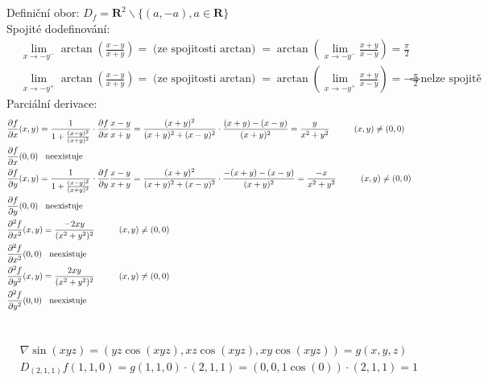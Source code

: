 \documentclass[a4paper]{article}
\begin{document}
\section{}
Definiční obor: $D_f = \mathbf{R}^2 \backslash \{ (a,-a), a \in \mathbf{R} \}$ \\
Spojité dodefinování:
\begin{align*}
	& \lim_{x \to -y^-} \arctan(\frac{x-y}{x+y}) = \text{(ze spojitosti $\arctan$)} = \arctan(\lim_{x \to -y^-} \frac{x+y}{x-y}) = \frac{\pi}{2}  \\
	& \lim_{x \to -y^+} \arctan(\frac{x-y}{x+y}) = \text{(ze spojitosti $\arctan$)} = \arctan(\lim_{x \to -y^+} \frac{x+y}{x-y}) = -\frac{\pi}{2} 
	& \Rightarrow \text{nelze spojitě dodefinovat}
\end{align*}
Parciální derivace:
\begin{align*}
	& \frac{\partial f}{\partial x} (x,y) = \frac{1}{1+\frac{(x-y)^2}{(x+y)^2}} \cdot \frac{\partial f}{\partial x}\frac{x-y}{x+y} = \frac{(x+y)^2}{(x+y)^2+(x-y)^2} \cdot \frac{(x+y) - (x-y)}{(x+y)^2} = \frac{y}{x^2+y^2} \hspace{1cm} (x,y) \ne (0,0) \\
	& \frac{\partial f}{\partial x} (0,0)\hspace{0.3cm} \text{neexistuje} \\
	& \frac{\partial f}{\partial y} (x,y) = \frac{1}{1+\frac{(x-y)^2}{(x+y)^2}} \cdot \frac{\partial f}{\partial y}\frac{x-y}{x+y} = \frac{(x+y)^2}{(x+y)^2+(x-y)^2} \cdot \frac{-(x+y) - (x-y)}{(x+y)^2} = \frac{-x}{x^2+y^2} \hspace{1cm} (x,y) \ne (0,0) \\
	& \frac{\partial f}{\partial y} (0,0)\hspace{0.3cm} \text{neexistuje} \\
	& \frac{\partial^2 f}{\partial x^2} (x,y) = \frac{-2xy}{(x^2+y^2)^2} \hspace{1cm} (x,y) \ne (0,0) \\
	& \frac{\partial^2 f}{\partial x^2} (0,0)\hspace{0.3cm} \text{neexistuje} \\
	& \frac{\partial^2 f}{\partial y^2} (x,y) = \frac{2xy}{(x^2+y^2)^2} \hspace{1cm} (x,y) \ne (0,0) \\
	& \frac{\partial^2 f}{\partial y^2} (0,0)\hspace{0.3cm} \text{neexistuje} \\
\end{align*}

\section{}
\begin{align*}
	& \nabla \sin(xyz) = (yz \cos(xyz),xz \cos(xyz),xy \cos(xyz)) = g(x,y,z) \\
	& D_{(2,1,1)} f(1,1,0) = g(1, 1, 0) \cdot (2, 1, 1) = (0, 0, 1 \cos(0)) \cdot (2, 1, 1) = 1
\end{align*}
\end{document}
